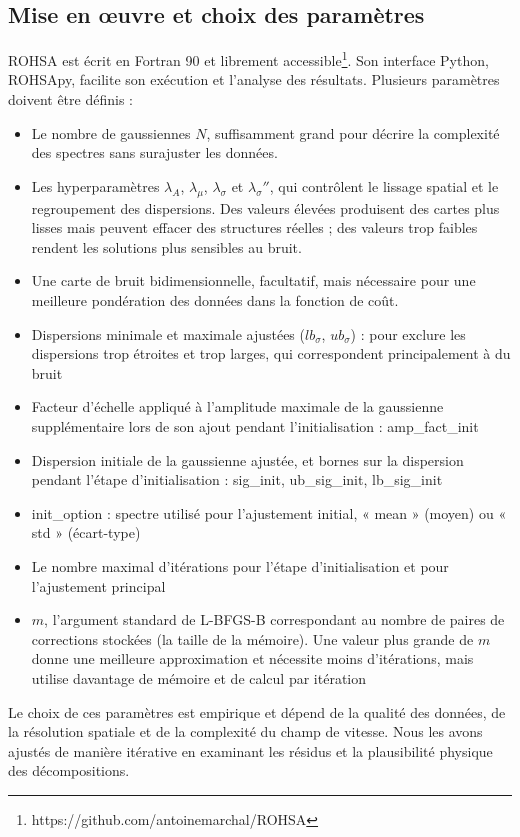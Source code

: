 \subsection{Mise en œuvre et choix des paramètres}

ROHSA est écrit en Fortran 90 et librement accessible\footnote{https://github.com/antoinemarchal/ROHSA}. Son interface Python, ROHSApy, facilite son exécution et l'analyse des résultats. Plusieurs paramètres doivent être définis :
\begin{itemize}
\item Le nombre de gaussiennes $N$, suffisamment grand pour décrire la complexité des spectres sans surajuster les données.
\item Les hyperparamètres $\lambda_A$, $\lambda_\mu$, $\lambda_\sigma$ et $\lambda_\sigma''$, qui contrôlent le lissage spatial et le regroupement des dispersions. Des valeurs élevées produisent des cartes plus lisses mais peuvent effacer des structures réelles ; des valeurs trop faibles rendent les solutions plus sensibles au bruit.
\item Une carte de bruit bidimensionnelle, facultatif, mais nécessaire pour une meilleure pondération des données dans la fonction de coût.
\item Dispersions minimale et maximale ajustées ($lb_\sigma$, $ub_\sigma$) : pour exclure les dispersions trop étroites et trop larges, qui correspondent principalement à du bruit
\item Facteur d'échelle appliqué à l'amplitude maximale de la gaussienne supplémentaire lors de son ajout pendant l'initialisation : amp\_fact\_init
\item Dispersion initiale de la gaussienne ajustée, et bornes sur la dispersion pendant l'étape d'initialisation : sig\_init, ub\_sig\_init, lb\_sig\_init
\item init\_option : spectre utilisé pour l'ajustement initial, « mean » (moyen) ou « std » (écart-type)
\item Le nombre maximal d'itérations pour l'étape d'initialisation et pour l'ajustement principal
\item $m$, l'argument standard de L-BFGS-B correspondant au nombre de paires de corrections stockées (la taille de la mémoire). Une valeur plus grande de $m$ donne une meilleure approximation et nécessite moins d'itérations, mais utilise davantage de mémoire et de calcul par itération
\end{itemize}
\noindent Le choix de ces paramètres est empirique et dépend de la qualité des données, de la résolution spatiale et de la complexité du champ de vitesse. Nous les avons ajustés de manière itérative en examinant les résidus et la plausibilité physique des décompositions.\\\indent
